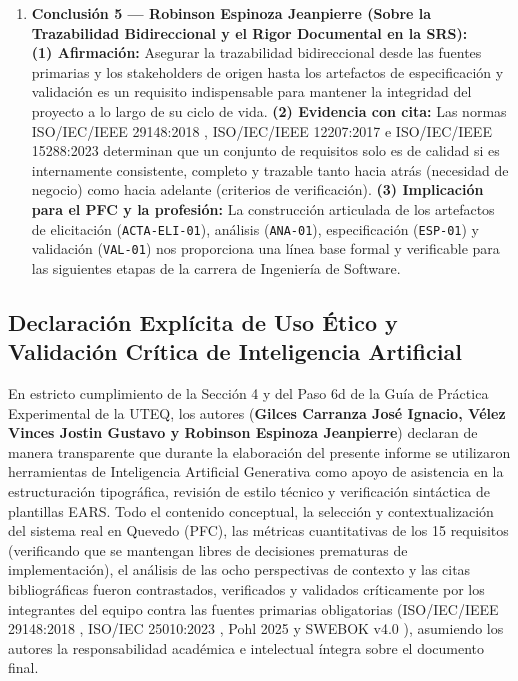 \begin{enumerate}
	\item \textbf{Conclusión 5 --- Robinson Espinoza Jeanpierre (Sobre la Trazabilidad Bidireccional y el Rigor Documental en la SRS):} \\
	\textbf{(1) Afirmación:} Asegurar la trazabilidad bidireccional desde las fuentes primarias y los stakeholders de origen hasta los artefactos de especificación y validación es un requisito indispensable para mantener la integridad del proyecto a lo largo de su ciclo de vida. \textbf{(2) Evidencia con cita:} Las normas ISO/IEC/IEEE 29148:2018 \cite{ieee29148}, ISO/IEC/IEEE 12207:2017 \cite{ieee12207} e ISO/IEC/IEEE 15288:2023 \cite{ieee15288} determinan que un conjunto de requisitos solo es de calidad si es internamente consistente, completo y trazable tanto hacia atrás (necesidad de negocio) como hacia adelante (criterios de verificación). \textbf{(3) Implicación para el PFC y la profesión:} La construcción articulada de los artefactos de elicitación (\texttt{ACTA-ELI-01}), análisis (\texttt{ANA-01}), especificación (\texttt{ESP-01}) y validación (\texttt{VAL-01}) nos proporciona una línea base formal y verificable para las siguientes etapas de la carrera de Ingeniería de Software.
\end{enumerate}
\subsection{Declaración Explícita de Uso Ético y Validación Crítica de Inteligencia Artificial}
En estricto cumplimiento de la Sección 4 y del Paso 6d de la Guía de Práctica Experimental de la UTEQ, los autores (\textbf{Gilces Carranza José Ignacio, Vélez Vinces Jostin Gustavo y Robinson Espinoza Jeanpierre}) declaran de manera transparente que durante la elaboración del presente informe se utilizaron herramientas de Inteligencia Artificial Generativa como apoyo de asistencia en la estructuración tipográfica, revisión de estilo técnico y verificación sintáctica de plantillas EARS. Todo el contenido conceptual, la selección y contextualización del sistema real en Quevedo (PFC), las métricas cuantitativas de los 15 requisitos (verificando que se mantengan libres de decisiones prematuras de implementación), el análisis de las ocho perspectivas de contexto y las citas bibliográficas fueron contrastados, verificados y validados críticamente por los integrantes del equipo contra las fuentes primarias obligatorias (ISO/IEC/IEEE 29148:2018 \cite{ieee29148}, ISO/IEC 25010:2023 \cite{iso25010}, Pohl 2025 \cite{pohl2025} y SWEBOK v4.0 \cite{swebok2024}), asumiendo los autores la responsabilidad académica e intelectual íntegra sobre el documento final.
